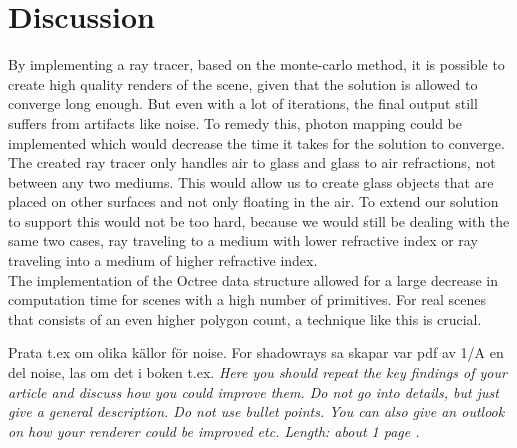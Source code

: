 \documentclass[a4paper, 12pt]{report}
\begin{document}
\chapter{Discussion} \label{ch:discussion}
By implementing a ray tracer, based on the monte-carlo method, it is possible to create high quality renders of the scene, given that the solution is allowed to converge long enough.
But even with a lot of iterations, the final output still suffers from artifacts like noise.
To remedy this, photon mapping could be implemented which would decrease the time it takes for the solution to converge.\\

The created ray tracer only handles air to glass and glass to air refractions, not between any two mediums.
This would allow us to create glass objects that are placed on other surfaces and not only floating in the air.
To extend our solution to support this would not be too hard, because we would still be dealing with the same two cases, ray traveling to a medium with lower refractive index or ray traveling into a medium of higher refractive index.
\\

The implementation of the Octree data structure allowed for a large decrease in computation time for scenes with a high number of primitives. For real scenes that consists of an even higher polygon count, a technique like this is crucial.



Prata t.ex om olika källor för noise. For shadowrays sa skapar var pdf av 1/A en del noise, las om det i boken t.ex.
\emph{Here you should repeat the key findings of your article and discuss how you could improve them. 
Do not go into details, but just give a general description. 
Do not use bullet points. 
You can also give an outlook on how your renderer could be improved etc. 
Length: about 1 page .}



\end{document}
